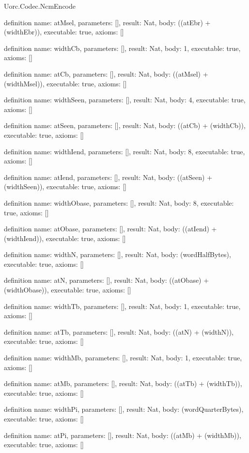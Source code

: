 \begin{lexlean}{Uorc.Codec.NcmEncode}
\begin{semanticmodule}
definition{
  name: atMsel,
  parameters: [],
  result: Nat,
  body: ((atEbr) + (widthEbr)),
  executable: true,
  axioms: []
}

definition{
  name: widthCb,
  parameters: [],
  result: Nat,
  body: 1,
  executable: true,
  axioms: []
}

definition{
  name: atCb,
  parameters: [],
  result: Nat,
  body: ((atMsel) + (widthMsel)),
  executable: true,
  axioms: []
}

definition{
  name: widthSeen,
  parameters: [],
  result: Nat,
  body: 4,
  executable: true,
  axioms: []
}

definition{
  name: atSeen,
  parameters: [],
  result: Nat,
  body: ((atCb) + (widthCb)),
  executable: true,
  axioms: []
}

definition{
  name: widthIend,
  parameters: [],
  result: Nat,
  body: 8,
  executable: true,
  axioms: []
}

definition{
  name: atIend,
  parameters: [],
  result: Nat,
  body: ((atSeen) + (widthSeen)),
  executable: true,
  axioms: []
}

definition{
  name: widthObase,
  parameters: [],
  result: Nat,
  body: 8,
  executable: true,
  axioms: []
}

definition{
  name: atObase,
  parameters: [],
  result: Nat,
  body: ((atIend) + (widthIend)),
  executable: true,
  axioms: []
}

definition{
  name: widthN,
  parameters: [],
  result: Nat,
  body: (wordHalfBytes),
  executable: true,
  axioms: []
}

definition{
  name: atN,
  parameters: [],
  result: Nat,
  body: ((atObase) + (widthObase)),
  executable: true,
  axioms: []
}

definition{
  name: widthTb,
  parameters: [],
  result: Nat,
  body: 1,
  executable: true,
  axioms: []
}

definition{
  name: atTb,
  parameters: [],
  result: Nat,
  body: ((atN) + (widthN)),
  executable: true,
  axioms: []
}

definition{
  name: widthMb,
  parameters: [],
  result: Nat,
  body: 1,
  executable: true,
  axioms: []
}

definition{
  name: atMb,
  parameters: [],
  result: Nat,
  body: ((atTb) + (widthTb)),
  executable: true,
  axioms: []
}

definition{
  name: widthPi,
  parameters: [],
  result: Nat,
  body: (wordQuarterBytes),
  executable: true,
  axioms: []
}

definition{
  name: atPi,
  parameters: [],
  result: Nat,
  body: ((atMb) + (widthMb)),
  executable: true,
  axioms: []
}


\end{semanticmodule}
\end{lexlean}
